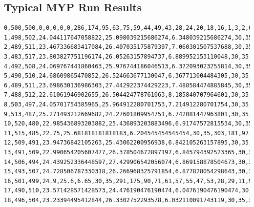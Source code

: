 \documentclass[authoryearcitations]{UoYCSproject}
\begin{document}
\begin{landscape}
\section{Typical MYP Run Results}
\pagestyle{plain}
\scriptsize
\begin{verbatim}
0,500,500,0,0,0,0,0,286,174,95,63,75,59,44,49,43,28,24,20,18,16,1,3,2,0,0
1,498,502,24.044117647058822,25.098039215686274,6.348039215686274,30,35,292,155,99,75,46,68,61,40,46,34,24,22,17,12,7,1,1,0,0
2,489,511,23.467336683417084,26.407035175879397,7.060301507537688,30,35,276,181,85,70,70,46,64,51,37,30,34,23,11,13,6,2,1,0,0
3,483,517,23.803827751196174,26.05263157894737,6.889952153110048,30,35,285,177,85,67,60,61,49,56,45,27,30,25,12,7,8,5,0,1,0
4,492,508,24.069767441860463,25.976744186046513,6.372093023255814,30,35,288,193,84,57,62,54,54,44,53,27,24,25,14,9,8,4,0,0,0
5,490,510,24.68609865470852,26.524663677130047,6.367713004484305,30,35,309,169,107,48,53,58,50,43,45,34,26,18,18,10,7,2,3,0,0
6,489,511,23.698630136986303,27.442922374429223,7.488584474885845,30,35,307,181,94,71,43,41,62,40,36,38,34,17,15,12,3,5,1,0,0
7,488,512,22.61061946902655,26.504424778761063,8.185840707964601,30,35,317,179,91,60,71,35,37,56,29,44,25,23,14,10,5,1,3,0,0
8,503,497,24.05701754385965,25.964912280701753,7.214912280701754,30,35,315,195,94,60,47,65,28,40,40,34,32,17,11,10,9,1,2,0,0
9,513,487,25.271493212669682,24.27601809954751,6.742081447963801,30,35,309,193,103,63,54,35,63,25,35,36,25,28,10,10,9,1,1,0,0
10,520,480,22.985436893203882,25.436893203883496,6.91747572815534,30,35,295,183,105,76,53,52,35,58,21,33,32,25,13,11,8,0,0,0,0
11,515,485,22.75,25.681818181818183,6.204545454545454,30,35,303,181,97,79,57,53,45,32,45,26,26,22,16,9,7,2,0,0,0
12,509,491,23.94736842105263,25.43062200956938,6.842105263157895,30,35,295,182,94,68,76,54,50,37,36,29,25,14,22,9,6,3,0,0,0
13,491,509,22.990654205607477,26.378504672897197,6.845794392523365,30,35,307,158,98,73,59,67,48,47,33,29,19,27,13,14,6,2,0,0,0
14,506,494,24.439252336448597,27.429906542056074,6.869158878504673,30,35,302,174,85,75,59,56,71,45,36,25,21,15,20,9,4,2,1,0,0
15,493,507,24.728506787330318,26.266968325791854,6.877828054298643,30,35,310,169,99,62,63,56,54,65,30,31,19,10,15,9,4,3,1,0,0
16,501,499,24.9,25.6,6.65,30,35,291,175,90,71,61,57,55,47,53,28,29,11,9,15,6,1,1,0,0
17,490,510,23.571428571428573,24.476190476190474,6.0476190476190474,30,35,292,185,71,69,65,61,56,44,42,42,25,21,8,8,9,1,1,0,0
18,496,504,23.23394495412844,26.3302752293578,6.032110091743119,30,35,301,177,93,57,64,57,59,43,37,35,30,23,9,7,5,3,0,0,0

\end{verbatim}
\end{landscape}
\end{document}
